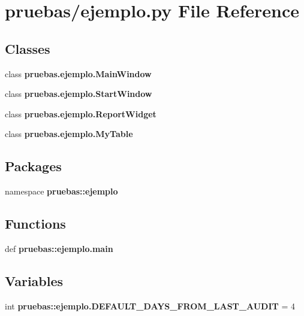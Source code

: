 \section{pruebas/ejemplo.py \-File \-Reference}
\label{ejemplo_8py}
\subsection*{\-Classes}
\begin{DoxyCompactItemize}
\item 
class {\bf pruebas.\-ejemplo.\-Main\-Window}
\item 
class {\bf pruebas.\-ejemplo.\-Start\-Window}
\item 
class {\bf pruebas.\-ejemplo.\-Report\-Widget}
\item 
class {\bf pruebas.\-ejemplo.\-My\-Table}
\end{DoxyCompactItemize}
\subsection*{\-Packages}
\begin{DoxyCompactItemize}
\item 
namespace {\bf pruebas\-::ejemplo}
\end{DoxyCompactItemize}
\subsection*{\-Functions}
\begin{DoxyCompactItemize}
\item 
def {\bf pruebas\-::ejemplo.\-main}
\end{DoxyCompactItemize}
\subsection*{\-Variables}
\begin{DoxyCompactItemize}
\item 
int {\bf pruebas\-::ejemplo.\-D\-E\-F\-A\-U\-L\-T\-\_\-\-D\-A\-Y\-S\-\_\-\-F\-R\-O\-M\-\_\-\-L\-A\-S\-T\-\_\-\-A\-U\-D\-I\-T} = 4
\end{DoxyCompactItemize}
